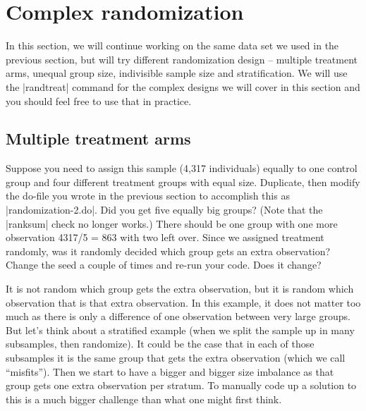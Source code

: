 \documentclass{tufte-handout}
\begin{document}
\section{Complex randomization}

In this section, we will continue working on the same data set
we used in the previous section,
but will try different randomization design –
multiple treatment arms, unequal group size,
indivisible sample size and stratification.
We will use the |randtreat| command for the complex designs we will cover
in this section and you should feel free to use that in practice.

\subsection{Multiple treatment arms}

Suppose you need to assign this sample (4,317 individuals) equally
to one control group and four different treatment groups with equal size.
Duplicate, then modify the do-file you wrote in the previous section
to accomplish this as |randomization-2.do|.
Did you get five equally big groups?
(Note that the |ranksum| check no longer works.)
There should be one group with one more observation 4317/5 = 863
with two left over. Since we assigned treatment randomly,
was it randomly decided which group gets an extra observation?
Change the seed a couple of times and re-run your code. Does it change?

It is not random which group gets the extra observation,
but it is random which observation that is that extra observation.
In this example, it does not matter too much as there is only
a difference of one observation between very large groups.
But let’s think about a stratified example
(when we split the sample up in many subsamples, then randomize).
It could be the case that in each of those subsamples
it is the same group that gets the extra observation (which we call “misfits”).
Then we start to have a bigger and bigger size imbalance
as that group gets one extra observation per stratum.
To manually code up a solution to this
is a much bigger challenge than what one might first think.
\end{document}
